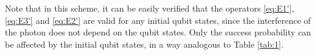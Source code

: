 \documentclass[letterpaper,10pt]{article}
\begin{document}
Note that in this scheme, it can be easily verified that the operators \ref{eq:E1'}, \ref{eq:E3'} and \ref{eq:E2'} are valid for any initial qubit states, since the interference of the photon does not depend on the qubit states. Only the success probability can be affected by the initial qubit states, in a way analogous to Table \ref{tab:1}.
%
%
%
\end{document}
